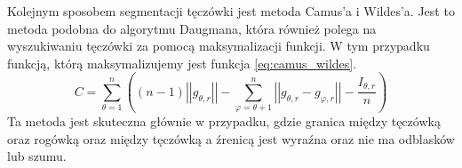 Kolejnym sposobem segmentacji tęczówki jest metoda Camus'a i Wildes'a\cite{Camus}. Jest to metoda podobna do algorytmu Daugmana, która również polega na wyszukiwaniu tęczówki za pomocą maksymalizacji funkcji. W tym przypadku funkcją, którą maksymalizujemy jest funkcja \ref{eq:camus_wildes}. 
\begin{equation}
\label{eq:daugman}
C=\sum_{\theta =1}^{n} ((n-1)\left|\left| g_{\theta,r} \right|\right| - \sum_{\varphi=\theta + 1 } ^{n} \left| \left| g_{\theta,r} - g_{\varphi,r} \right| \right| - \frac{I_{\theta,r}}{n}  )
\end{equation}
Ta metoda jest skuteczna głównie w przypadku, gdzie granica między tęczówką oraz rogówką oraz między tęczówką a źrenicą jest wyraźna oraz nie ma odblasków lub szumu.














